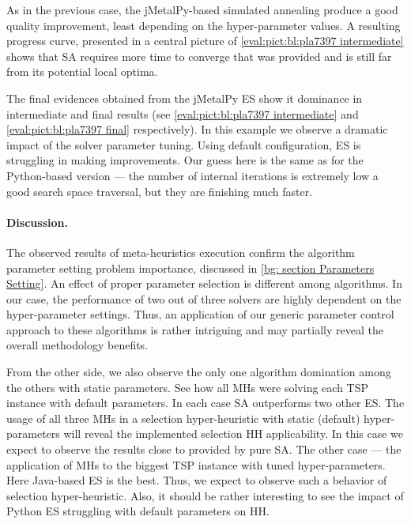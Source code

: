 As in the previous case, the jMetalPy-based simulated annealing produce a good quality improvement, least depending on the hyper-parameter values. A resulting progress curve, presented in a central picture of \cref{eval:pict:bl:pla7397 intermediate} shows that SA requires more time to converge that was provided and is still far from its potential local optima.

The final evidences obtained from the jMetalPy ES show it dominance in intermediate and final results (see \cref{eval:pict:bl:pla7397 intermediate} and \cref{eval:pict:bl:pla7397 final} respectively). In this example we observe a dramatic impact of the solver parameter tuning. Using default configuration, ES is struggling in making improvements. Our guess here is the same as for the Python-based version — the number of internal iterations is extremely low a good search space traversal, but they are finishing much faster.


\paragraph{Discussion.} The observed results of meta-heuristics execution confirm the algorithm parameter setting problem importance, discussed in \cref{bg: section Parameters Setting}. An effect of proper parameter selection is different among algorithms. In our case, the performance of two out of three solvers are highly dependent on the hyper-parameter settings. Thus, an application of our generic parameter control approach to these algorithms is rather intriguing and may partially reveal the overall methodology benefits.

From the other side, we also observe the only one algorithm domination among the others with static parameters. See how all MHs were solving each TSP instance with default parameters. In each case SA outperforms two other ES. The usage of all three MHs in a selection hyper-heuristic with static (default) hyper-parameters will reveal the implemented selection HH applicability. In this case we expect to observe the results close to provided by pure SA. The other case — the application of MHs to the biggest TSP instance with tuned hyper-parameters. Here Java-based ES is the best. Thus, we expect to observe such a behavior of selection hyper-heuristic. Also, it should be rather interesting to see the impact of Python ES struggling with default parameters on HH.

